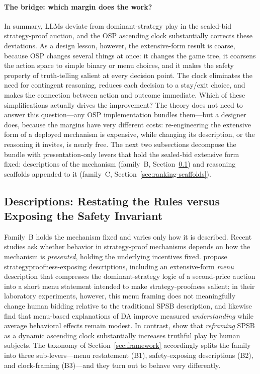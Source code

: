 \paragraph{The bridge: which margin does the work?}
In summary, LLMs deviate from dominant-strategy play in the sealed-bid
strategy-proof auction, and the OSP ascending clock substantially corrects these
deviations. As a design lesson, however, the extensive-form result is coarse,
because OSP changes several things at once: it changes the game tree, it
coarsens the action space to simple binary or menu choices, and it makes the
safety property of truth-telling salient at every decision point. The clock
eliminates the need for contingent reasoning, reduces each decision to a
stay/exit choice, and makes the connection between action and outcome
immediate. Which of these simplifications actually drives the improvement?
The theory does not need to answer this question---any OSP implementation
bundles them---but a designer does, because the margins have very different
costs: re-engineering the extensive form of a deployed mechanism is
expensive, while changing its description, or the reasoning it invites, is
nearly free. The next two subsections decompose the bundle with
presentation-only levers that hold the sealed-bid extensive form fixed:
descriptions of the mechanism (family~B,
Section~\ref{sec:ranking-descriptions}) and reasoning scaffolds appended to
it (family~C, Section~\ref{sec:ranking-scaffolds}).

\subsection{Descriptions: Restating the Rules versus Exposing the Safety
Invariant}\label{sec:ranking-descriptions}

Family~B holds the mechanism fixed and varies only how it is described.
Recent studies ask whether behavior in strategy-proof mechanisms depends on
how the mechanism is \emph{presented}, holding the underlying incentives
fixed. \citet{gonczarowski2023strategyproofness} propose
strategyproofness-exposing descriptions, including an extensive-form
\emph{menu} description that compresses the dominant-strategy logic of a
second-price auction into a short menu statement intended to make
strategy-proofness salient; in their laboratory experiments, however, this
menu framing does not meaningfully change human bidding relative to the
traditional SPSB description, and \citet{gonczarowski2024describing} likewise
find that menu-based explanations of DA improve measured \emph{understanding}
while average behavioral effects remain modest. In contrast,
\citet{breitmoser2022obviousness} show that \emph{reframing} SPSB as a
dynamic ascending clock substantially increases truthful play by human
subjects. The taxonomy of Section~\ref{sec:framework} accordingly splits the
family into three sub-levers---menu restatement (B1), safety-exposing
descriptions (B2), and clock-framing (B3)---and they turn out to behave very
differently.

